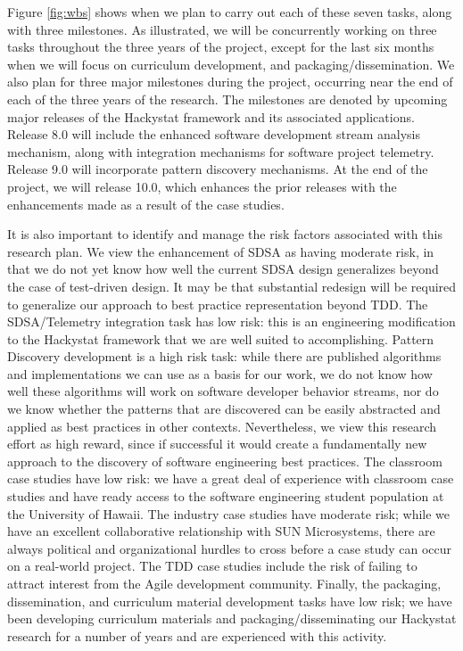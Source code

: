Figure \ref{fig:wbs} shows when we plan to carry out each of these seven
tasks, along with three milestones.  As illustrated, we will be
concurrently working on three tasks throughout the three years of the
project, except for the last six months when we will focus on curriculum
development, and packaging/dissemination.  We also plan for three major
milestones during the project, occurring near the end of each of the three
years of the research. The milestones are denoted by upcoming major
releases of the Hackystat framework and its associated applications.
Release 8.0 will include the enhanced software development stream analysis
mechanism, along with integration mechanisms for software project
telemetry.  Release 9.0 will incorporate pattern discovery mechanisms.  
At the end of the project, we will release 10.0, which enhances the prior
releases with the enhancements made as a result of the case studies. 

It is also important to identify and manage the risk factors associated with this
research plan.  We view the enhancement of SDSA as having moderate risk, in
that we do not yet know how well the current SDSA design generalizes beyond
the case of test-driven design.  It may be that substantial redesign will
be required to generalize our approach to best practice representation beyond
TDD.  The SDSA/Telemetry integration task has low risk: this is an
engineering modification to the Hackystat framework that we are well suited
to accomplishing.  Pattern Discovery development is a high risk task: while
there are published algorithms and implementations we can use as a basis
for our work, we do not know how well these algorithms will work on
software developer behavior streams, nor do we know whether the patterns
that are discovered can be easily abstracted and applied as best practices
in other contexts.  Nevertheless, we view this research effort as high
reward, since if successful it would create a fundamentally new approach to
the discovery of software engineering best practices.  The classroom case
studies have low risk: we have a great deal of experience with
classroom case studies and have ready access to the software engineering
student population at the University of Hawaii.  The industry case studies
have moderate risk; while we have an excellent collaborative relationship
with SUN Microsystems, there are always political and organizational
hurdles to cross before a case study can occur on a real-world project.
The TDD case studies include the risk of failing to attract interest from the
Agile development community.  Finally, the packaging, dissemination, and
curriculum material development tasks have low risk; we have been
developing curriculum materials and packaging/disseminating our Hackystat
research for a number of years and are experienced with this activity.

